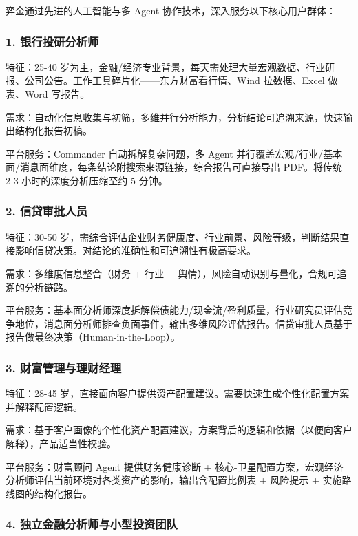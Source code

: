 \documentclass[
]{ctexart}
\begin{document}
弈金通过先进的人工智能与多 Agent 协作技术，深入服务以下核心用户群体：

\subsubsection{1.
银行投研分析师}\label{ux94f6ux884cux6295ux7814ux5206ux6790ux5e08}

特征：25-40
岁为主，金融/经济专业背景，每天需处理大量宏观数据、行业研报、公司公告。工作工具碎片化------东方财富看行情、Wind
拉数据、Excel 做表、Word 写报告。

需求：自动化信息收集与初筛，多维并行分析能力，分析结论可追溯来源，快速输出结构化报告初稿。

平台服务：Commander 自动拆解复杂问题，多 Agent
并行覆盖宏观/行业/基本面/消息面维度，每条结论附搜索来源链接，综合报告可直接导出
PDF。将传统 2-3 小时的深度分析压缩至约 5 分钟。

\subsubsection{2.
信贷审批人员}\label{ux4fe1ux8d37ux5ba1ux6279ux4ebaux5458}

特征：30-50
岁，需综合评估企业财务健康度、行业前景、风险等级，判断结果直接影响信贷决策。对结论的准确性和可追溯性有极高要求。

需求：多维度信息整合（财务 + 行业 +
舆情），风险自动识别与量化，合规可追溯的分析链路。

平台服务：基本面分析师深度拆解偿债能力/现金流/盈利质量，行业研究员评估竞争地位，消息面分析师排查负面事件，输出多维风险评估报告。信贷审批人员基于报告做最终决策（Human-in-the-Loop）。

\subsubsection{3.
财富管理与理财经理}\label{ux8d22ux5bccux7ba1ux7406ux4e0eux7406ux8d22ux7ecfux7406}

特征：28-45
岁，直接面向客户提供资产配置建议。需要快速生成个性化配置方案并解释配置逻辑。

需求：基于客户画像的个性化资产配置建议，方案背后的逻辑和依据（以便向客户解释），产品适当性校验。

平台服务：财富顾问 Agent 提供财务健康诊断 +
核心-卫星配置方案，宏观经济分析师评估当前环境对各类资产的影响，输出含配置比例表
+ 风险提示 + 实施路线图的结构化报告。

\subsubsection{4.
独立金融分析师与小型投资团队}\label{ux72ecux7acbux91d1ux878dux5206ux6790ux5e08ux4e0eux5c0fux578bux6295ux8d44ux56e2ux961f}
\end{document}
